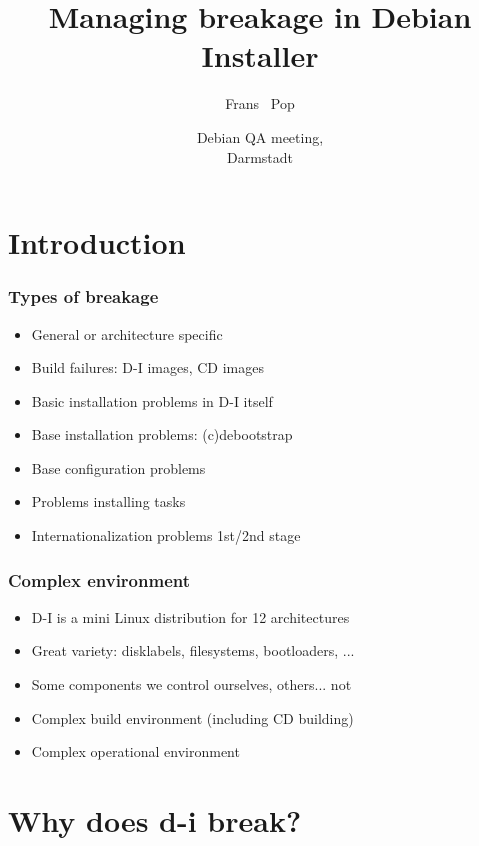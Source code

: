 \documentclass{beamer}
\title[Managing breakage in Debian Installer] %
{Managing breakage in Debian Installer}
\author %
{Frans ~Pop}
\date[QA 2005] %
{Debian QA meeting,\\ Darmstadt}
\begin{document}
\begin{frame}
  \titlepage
\end{frame}

\begin{frame}
  \tableofcontents
\end{frame}


\section{Introduction}

\begin{frame}
  \frametitle{Types of breakage}
	\begin{itemize}[<+->]
	\item
		General or architecture specific
	\item
		Build failures: D-I images, CD images
	\item
		Basic installation problems in D-I itself
	\item
		Base installation problems: (c)debootstrap
	\item
		Base configuration problems
	\item
		Problems installing tasks
	\item
		Internationalization problems 1st/2nd stage
	\end{itemize}
\end{frame}

\begin{frame}
  \frametitle{Complex environment}
	\begin{itemize}[<+->]
	\item
		D-I is a mini Linux distribution for 12 architectures
	\item
		Great variety: disklabels, filesystems, bootloaders, ...
	\item
		Some components we control ourselves, others... not
	\item
		Complex build environment (including CD building)
	\item
		Complex operational environment
	\end{itemize}
\end{frame}

\section{Why does d-i break?}
\end{document}
